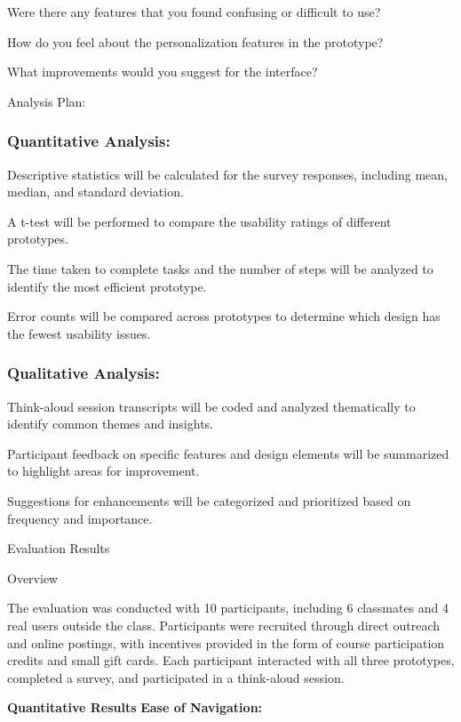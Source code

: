 \documentclass[
	letterpaper, %
]{jdf}
\begin{document}
Were there any features that you found confusing or difficult to use?

How do you feel about the personalization features in the prototype?

What improvements would you suggest for the interface?

Analysis Plan:

 

\subsubsection{Quantitative Analysis:}

Descriptive statistics will be calculated for the survey responses, including mean, median, and standard deviation.

A t-test will be performed to compare the usability ratings of different prototypes.

The time taken to complete tasks and the number of steps will be analyzed to identify the most efficient prototype.

Error counts will be compared across prototypes to determine which design has the fewest usability issues.

\subsubsection{Qualitative Analysis:}

Think-aloud session transcripts will be coded and analyzed thematically to identify common themes and insights.

Participant feedback on specific features and design elements will be summarized to highlight areas for improvement.

Suggestions for enhancements will be categorized and prioritized based on frequency and importance.

Evaluation Results

Overview

The evaluation was conducted with 10 participants, including 6 classmates and 4 real users outside the class. Participants were recruited through direct outreach and online postings, with incentives provided in the form of course participation credits and small gift cards. Each participant interacted with all three prototypes, completed a survey, and participated in a think-aloud session.

 

\textbf{Quantitative Results
}
\textbf{Ease of Navigation:
}
 
\end{document}
